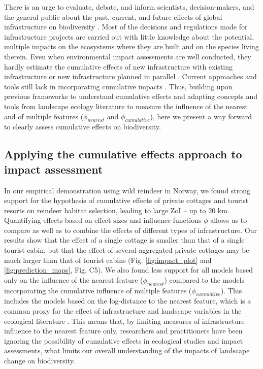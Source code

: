 \documentclass[titlepage]{article}
\begin{document}
{There is an urge to evaluate, debate, and inform scientists, decision-makers, and the general public about the past, current, and future effects of global infrastructure on biodiversity \citep{laurance_conservation_2018}. Most of the decisions and regulations made for infrastructure projects are carried out with little knowledge about the potential, multiple impacts on the ecosystems where they are built and on the species living therein. Even when environmental impact assessments are well conducted, they hardly estimate the cumulative effects of new infrastructure with existing infrastructure or new infrastructure planned in parallel \citep{laurance_roads_2017, johnson_regulating_2011}. Current approaches and tools still lack in incorporating cumulative impacts \citep[but see][for recent advances]{gillingham_integration_2016}. Thus, building upon previous frameworks to understand cumulative effects \citep{naugle_unifying_2011} and adapting concepts and tools from landscape ecology literature to measure the influence of the nearest and of multiple features ($\phi_{nearest}$ and $\phi_{cumulative}$), here we present a way forward to clearly assess cumulative effects on biodiversity. 

\subsection{Applying the cumulative effects approach to impact assessment}

In our empirical demonstration using wild reindeer in Norway, we found strong support for the hypothesis of cumulative effects of private cottages and tourist resorts on reindeer habitat selection, leading to large ZoI -- up to 20 km. Quantifying effects based on effect sizes and influence functions $\phi$ allows us to compare as well as to combine the effects of different types of infrastructure. Our results show that the effect of a single cottage is smaller than that of a single tourist cabin, but that the effect of several aggregated private cottages may be much larger than that of tourist cabins (Fig. \ref{fig:impact_plot} and \ref{fig:prediction_maps}, Fig. C5). We also found less support for all models based only on the influence of the nearest feature ($\phi_{nearest}$) compared to the models incorporating the cumulative influence of multiple features ($\phi_{cumulative}$). This includes the models based on the log-distance to the nearest feature, which is a common proxy for the effect of infrastructure and landscape variables in the ecological literature \citep[e.g.][]{torres_assessing_2016,polfus_identifying_2011}. This means that, by limiting measures of infrastructure influence to the nearest feature only, researchers and practitioners have been ignoring the possibility of cumulative effects in ecological studies and impact assessments, what limits our overall understanding of the impacts of landscape change on biodiversity.

}
\end{document}

